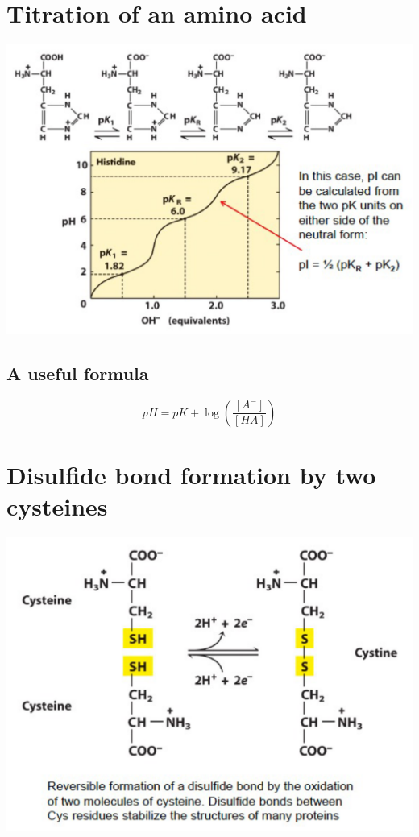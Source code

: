 \documentclass[11pt]{article}
\begin{document}
\section{Titration of an amino acid}
\label{sec:orgde3774c}
\begin{center}
\includegraphics[width=.9\linewidth]{./images/titration-of-an-amino-acid.png}
\end{center}
\subsection{A useful formula}
\label{sec:orgedea562}
\[pH = pK + \log \left( \frac{[A^-]}{[HA]}\right)\]
\section{Disulfide bond formation by two cysteines}
\label{sec:org236847b}
\begin{center}
\includegraphics[width=.9\linewidth]{./images/cysteine-disulfide-bond-formation.png}
\end{center}
\end{document}
